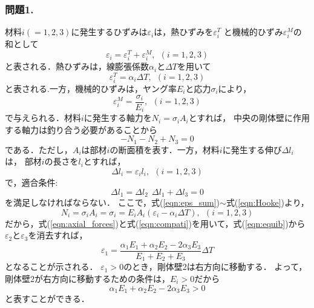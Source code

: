 ﻿\documentclass[10pt,a4j]{jarticle}
\begin{document}
\subsubsection*{問題1.}
材料$i(=1,2,3)$に発生するひずみは$\varepsilon_i$は，熱ひずみを$\varepsilon_i^T$
と機械的ひずみ$\varepsilon_i^M$の和として
\begin{equation}
	\varepsilon_i =
	\varepsilon_i^T 
	+
	\varepsilon_i^M, \ \ (i=1,2,3) 
	\label{eqn:eps_sum}
\end{equation}
と表される．熱ひずみは，線膨張係数$\alpha_i$と$\Delta T$を用いて
\begin{equation}
	\varepsilon_i^T= \alpha_i \Delta T, \ \ (i=1,2,3)
\end{equation}
と表される.一方，機械的ひずみは，ヤング率$E_i$と応力$\sigma_i$により，
\begin{equation}
	\varepsilon_i^M= \frac{\sigma_i}{E_i}, \ \ (i=1,2,3)
	\label{eqn:Hooke}
\end{equation}
で与えられる．材料$i$に発生する軸力を$N_i=\sigma_i A_i$とすれば，
中央の剛体壁に作用する軸力は釣り合う必要があることから
\begin{equation}
	-N_1-N_2+N_3=0 
	\label{eqn:equib}
\end{equation}
である．ただし，$A_i$は部材$i$の断面積を表す．一方，材料$i$に発生する伸び$\Delta l_i$は，
部材$i$の長さを$l_i$とすれば，
\begin{equation}
	\Delta l_i = \varepsilon_i l_i, \ \ (i=1,2,3) 
\end{equation}
で，適合条件:
\begin{equation}
	\Delta l_1=\Delta l_2 \ \ \Delta l_1+\Delta l_3=0
	\label{eqn:compati}
\end{equation}
を満足しなければならない．
ここで，式(\ref{eqn:eps_sum})$\sim$式(\ref{eqn:Hooke})より，
\begin{equation}
	N_i=\sigma_i A_i=\sigma_i=E_iA_i\left( \varepsilon_i-\alpha_i \Delta T\right), \ \ (i=1,2,3)
	\label{eqn:axial_forces}
\end{equation}
だから，式(\ref{eqn:axial_forces})と式(\ref{eqn:compati})を用いて，式(\ref{eqn:equib})から
$\varepsilon_2$と$\varepsilon_3$を消去すれば，
\begin{equation}
	\varepsilon_1=\frac{\alpha_1E_1+\alpha_2E_2-2\alpha_3 E_3}{E_1+E_2+E_3} \Delta T
\end{equation}
となることが示される．
$\varepsilon_1>0$のとき，剛体壁2は右方向に移動する．
よって，剛体壁2が右方向に移動するための条件は，$E_i>0$だから
\begin{equation}
	\alpha_1E_1+\alpha_2E_2-2\alpha_3 E_3 >0
\end{equation}
と表すことができる．
\end{document}
